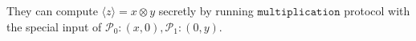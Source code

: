 \documentclass[letterpaper]{article} %
\begin{document}
    They can compute $\langle z\rangle=x\otimes y$ secretly
    by running $\mathtt{multiplication}$ protocol with the special input of
    $\mathcal{P}_{0}:(x,0),\mathcal{P}_{1}:(0,y)$.



    \begin{figure}[ht]
\end{figure}
\end{document}
